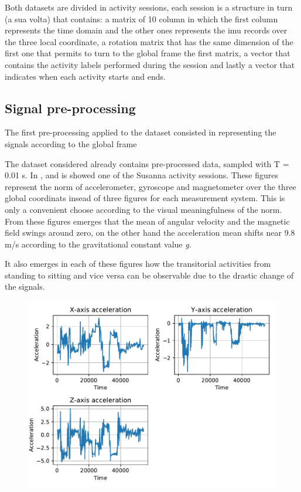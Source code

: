Both datasets are divided in activity sessions, each session is a structure in turn (a sua volta) that contains: a matrix of 10 column in which the first column represents the time domain and the other ones represents the \gls{imu} records over the three local coordinate, a rotation matrix that has the same dimension of the first one that permits to turn to the global frame the first matrix, a vector that contains the activity labels performed during the session and lastly a vector that indicates when each activity starts and ends.

\subsection{Signal pre-processing}
The first pre-processing applied to the dataset consisted in representing the signals according to the global frame


The dataset considered already contains pre-processed data, sampled with T = 0.01 s. In ,  and  is showed one of the Susanna activity sessions. These figures represent the norm of accelerometer, gyroscope and magnetometer over the three global coordinats insead of three figures for each measurement system. This is only a convenient choose according to the visual meaningfulness of the norm.
From these figures emerges that the mean of angular velocity and the magnetic field swings around zero, on the other hand the acceleration mean shifts near 9.8 m/s according to the gravitational constant value \textit{g}.

It also emerges in each of these figures how the transitorial activities from standing to sitting and vice versa can be observable due to the drastic change of the signals.

\begin{figure}
\includegraphics[scale=0.55]{acceleration_susanna.pdf}
\caption{}
\label{fig:acc}
\end{figure}

